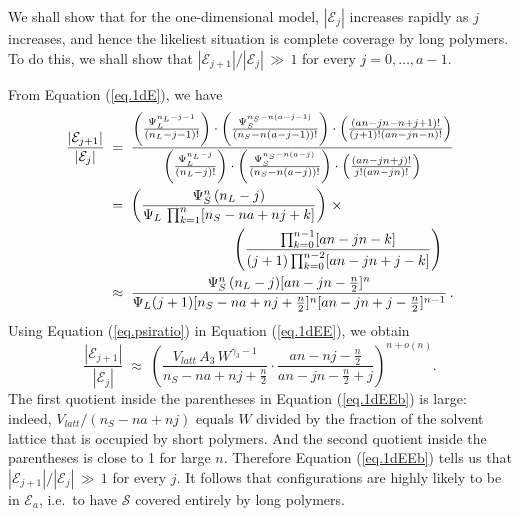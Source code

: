 \documentclass[journal=mamobx,manuscript=article]{achemso}
\begin{document}
We shall show that for the one-dimensional model, $|\mathcal{E}_j|$ increases rapidly as $j$ increases,
and hence the likeliest situation is complete coverage by long polymers.  To do this, we shall show that
$|\mathcal{E}_{j+1}|/|\mathcal{E}_j| \,\gg\,1$ for every $j=0,\ldots,a-1$.

From Equation (\ref{eq.1dE}), we have
\begin{align}
   \nonumber
    \frac{|\mathcal{E}_{j+1}|}{|\mathcal{E}_j|} \; & =\;   
    \frac{
     \left(\frac{\Psi_L^{n_{L}-j-1}}{(n_L-j-1)!}\right)\cdot\left(\frac{\Psi_S^{n_S-n(a-j-1)}}{
    (n_S-n(a-j-1))!}\right) \cdot\left( \frac{ (an-jn-n+j+1)!}{(j+1)!(an-jn-n)!} \right)
      }{
 \left(\frac{\Psi_L^{n_{L}-j}}{(n_L-j)!}\right)\cdot\left(\frac{\Psi_S^{n_S-n(a-j)}}{
    (n_S-n(a-j))!}\right) \cdot   \left( \frac{ (an-jn+j)!}{j!(an-jn)!} \right)    }
    \\
    \nonumber
    & = \;   \left( \frac{\Psi_S^n \,(n_L-j) }{\Psi_L \, \prod_{k=1}^n[n_S-na+nj+k]  }\right)  \,\times 
     \\
     \nonumber
    & \hspace{31mm}  \left(   \frac{  \prod_{k=0}^{n-1}[an-jn-k]    }{(j+1)  \prod_{k=0}^{n-2} [an-jn+j-k]   }\right)
    \\
    \label{eq.1dEE}
      & \approx \;   \frac{ \Psi_S^n \,(n_L-j) [an-jn-\frac{n}{2}]^n
         }{   \Psi_L (j+1)  [n_S-na+nj+\frac{n}{2}]^n  [an-jn+j-\frac{n}{2}]^{n-1} }   \,.
\end{align}
Using Equation (\ref{eq.psiratio}) in 
 Equation (\ref{eq.1dEE}), we obtain 
\begin{equation}
   \label{eq.1dEEb}  
    \frac{|\mathcal{E}_{j+1}|}{|\mathcal{E}_j|} \; \approx  \;   
      \left(   \frac{ V_{latt}\, A_3 \,W^{\gamma_3-1} }{n_S-na+nj+\frac{n}{2}} \cdot 
         \frac{ an-nj-\frac{n}{2} }{an-jn-\frac{n}{2}+j}   \right)^{n+o(n)}.
\end{equation}
The first quotient inside the parentheses in Equation (\ref{eq.1dEEb}) is large:  indeed,
$V_{latt}/(n_S-na+nj)$ equals $W$ divided by the fraction of the solvent lattice that is occupied by 
short polymers.  
And the second quotient inside the parentheses is close to 1 for large $n$.   Therefore 
Equation (\ref{eq.1dEEb}) tells us that $|\mathcal{E}_{j+1}|/|\mathcal{E}_j| \,\gg\,1$
for every $j$.  It follows that configurations are highly likely to be in $\mathcal{E}_a$, i.e.\
to have $\mathcal{S}$ covered entirely by long polymers.

\end{document}
